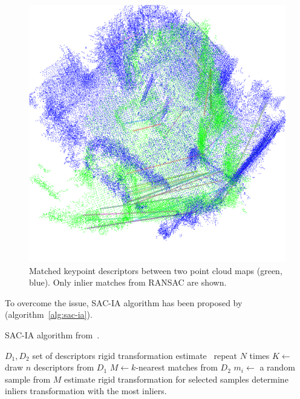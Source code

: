 \begin{figure}
    \centering
    \includegraphics[width=\textwidth]{../img/v1-matching.png}
    \caption[Keypoint matches]{Matched keypoint descriptors between two point cloud maps (green, blue). Only inlier matches from \gls{RANSAC} are shown.}
    \label{fig:v1-matching}
\end{figure}

To overcome the issue, \gls{SAC-IA} algorithm has been proposed by~\citet{rusu2009fpfh} (algorithm~\ref{alg:sac-ia}).

\begin{algorithm}
    \caption[\gls{SAC-IA}]{\gls{SAC-IA} algorithm from~\citet{rusu2009fpfh}.}
    \label{alg:sac-ia}
    \begin{algorithmic}[1]
        \Require $D_1, D_2$ set of descriptors
        \Ensure rigid transformation estimate
            \Loop~repeat $N$ times
                \State $K \gets$ draw $n$ descriptors from $D_1$
                    \State $M \gets k$-nearest matches from $D_2$
                    \State $m_i \gets$ a random sample from $M$
                \EndFor
                \State estimate rigid transformation for selected samples
                \State determine inliers
            \EndLoop
            \State \Return transformation with the most inliers.
        \EndFunction
    \end{algorithmic}
\end{algorithm}

